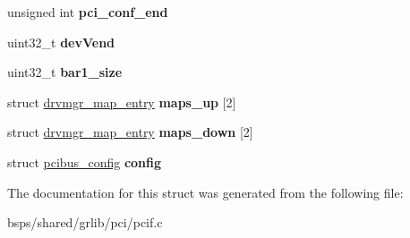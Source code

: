\begin{DoxyCompactItemize}
unsigned int {\bfseries pci\+\_\+conf\+\_\+end}
\item 
\mbox{\label{structpcif__priv_a817ca01e804f2a9ebc1a40299eab2196}} 
uint32\+\_\+t {\bfseries dev\+Vend}
\item 
\mbox{\label{structpcif__priv_ae1ac73a8ee5a8ac1e4565257433c8f10}} 
uint32\+\_\+t {\bfseries bar1\+\_\+size}
\item 
\mbox{\label{structpcif__priv_a9d21d944e347f5a81445978dce557ec5}} 
struct \mbox{\hyperlink{structdrvmgr__map__entry}{drvmgr\+\_\+map\+\_\+entry}} {\bfseries maps\+\_\+up} \mbox{[}2\mbox{]}
\item 
\mbox{\label{structpcif__priv_a4deee7d9b1808720d0a1c8ac908d56c1}} 
struct \mbox{\hyperlink{structdrvmgr__map__entry}{drvmgr\+\_\+map\+\_\+entry}} {\bfseries maps\+\_\+down} \mbox{[}2\mbox{]}
\item 
\mbox{\label{structpcif__priv_a8782b4d3b9100e31b51818a2e0b3c626}} 
struct \mbox{\hyperlink{structpcibus__config}{pcibus\+\_\+config}} {\bfseries config}
\end{DoxyCompactItemize}


The documentation for this struct was generated from the following file\+:\begin{DoxyCompactItemize}
\item 
bsps/shared/grlib/pci/pcif.\+c\end{DoxyCompactItemize}

